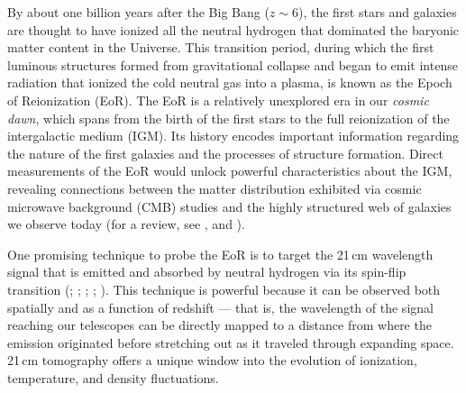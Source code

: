 \documentclass[preprint2,numberedappendix,tighten]{aastex6}  %
\begin{document}
By about one billion years after the Big Bang ($z \sim 6$), the first stars and galaxies are thought to have ionized all the 
neutral hydrogen that dominated the baryonic matter content in the Universe. This transition period, during which the first 
luminous structures formed from gravitational collapse and began to emit intense radiation that ionized the cold neutral gas 
into a plasma, is known as the Epoch of Reionization (EoR). The EoR is a relatively unexplored era in our \textit{cosmic dawn}, which spans from the birth of the first stars to the full reionization of the intergalactic medium (IGM). Its 
history encodes important information regarding the nature of the first galaxies and the processes of structure formation. 
Direct measurements of the EoR would unlock powerful characteristics about the IGM, revealing connections 
between the matter distribution exhibited via cosmic microwave background (CMB) studies and the highly structured 
web of galaxies we observe today (for a review, see \citet{barkana_and_loeb2001}, \citet{furlanetto_et_al2006} and \citet{loeb_furlanetto_2013}).

One promising technique to probe the EoR is to target the 21\,cm wavelength signal that is emitted and absorbed by neutral hydrogen via 
its spin-flip transition (\citealt{furlanetto_et_al2006}; \citealt{barkana_and_loeb2008}; \citealt{morales_and_wyithe2010}; \citealt{pritchard_and_loeb2010}; \citealt{pritchard_loeb2012}). This technique is powerful because it can be observed both spatially and as a function of redshift --- that is, the wavelength 
of the signal reaching our telescopes can be directly mapped to a distance from where the emission originated before 
stretching out as it traveled through expanding space. 21\,cm tomography offers a unique window into the 
evolution of ionization, temperature, and density fluctuations.
\end{document}

